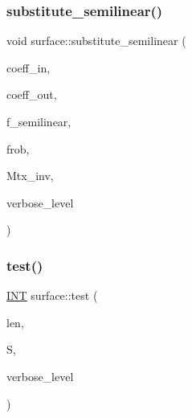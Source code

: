 \mbox{\label{classsurface_a7b34e4c561adbe664a4b0ba6711df457}} 
\subsubsection{\texorpdfstring{substitute\+\_\+semilinear()}{substitute\_semilinear()}}
{\footnotesize\ttfamily void surface\+::substitute\+\_\+semilinear (\begin{DoxyParamCaption}\item[{\mbox{\hyperlink{galois_8h_a09fddde158a3a20bd2dcadb609de11dc}{I\+NT}} $\ast$}]{coeff\+\_\+in,  }\item[{\mbox{\hyperlink{galois_8h_a09fddde158a3a20bd2dcadb609de11dc}{I\+NT}} $\ast$}]{coeff\+\_\+out,  }\item[{\mbox{\hyperlink{galois_8h_a09fddde158a3a20bd2dcadb609de11dc}{I\+NT}}}]{f\+\_\+semilinear,  }\item[{\mbox{\hyperlink{galois_8h_a09fddde158a3a20bd2dcadb609de11dc}{I\+NT}}}]{frob,  }\item[{\mbox{\hyperlink{galois_8h_a09fddde158a3a20bd2dcadb609de11dc}{I\+NT}} $\ast$}]{Mtx\+\_\+inv,  }\item[{\mbox{\hyperlink{galois_8h_a09fddde158a3a20bd2dcadb609de11dc}{I\+NT}}}]{verbose\+\_\+level }\end{DoxyParamCaption})}

\mbox{\label{classsurface_a8eabf9029a80a2b10651455a56b7e5f0}} 
\subsubsection{\texorpdfstring{test()}{test()}}
{\footnotesize\ttfamily \mbox{\hyperlink{galois_8h_a09fddde158a3a20bd2dcadb609de11dc}{I\+NT}} surface\+::test (\begin{DoxyParamCaption}\item[{\mbox{\hyperlink{galois_8h_a09fddde158a3a20bd2dcadb609de11dc}{I\+NT}}}]{len,  }\item[{\mbox{\hyperlink{galois_8h_a09fddde158a3a20bd2dcadb609de11dc}{I\+NT}} $\ast$}]{S,  }\item[{\mbox{\hyperlink{galois_8h_a09fddde158a3a20bd2dcadb609de11dc}{I\+NT}}}]{verbose\+\_\+level }\end{DoxyParamCaption})}

